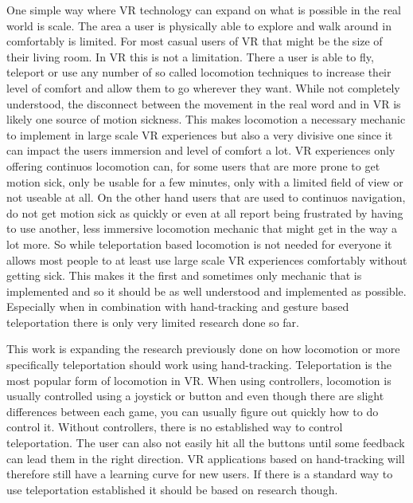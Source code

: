 One simple way where VR technology can expand on what is possible in the real world is scale. The area a user is physically able to explore and walk around in comfortably is limited. For most casual users of VR that might be the size of their living room. In VR this is not a limitation. There a user is able to fly, teleport or use any number of so called locomotion techniques to increase their level of comfort and allow them to go wherever they want. While not completely understood, the disconnect between the movement in the real word and in VR is likely one source of motion sickness. This makes locomotion a necessary mechanic to implement in large scale VR experiences but also a very divisive one since it can impact the users immersion and level of comfort a lot. VR experiences only offering continuos locomotion can, for some users that are more prone to get motion sick, only be usable for a few minutes, only with a limited field of view or not useable at all. On the other hand users that are used to continuos navigation, do not get motion sick as quickly or even at all report being frustrated by having to use another, less immersive locomotion mechanic that might get in the way a lot more. So while teleportation based locomotion is not needed for everyone it allows most people to at least use large scale VR experiences comfortably without getting sick. This makes it the first and sometimes only mechanic that is implemented and so it should be as well understood and implemented as possible. Especially when in combination with hand-tracking and gesture based teleportation there is only very limited research done so far.

This work is expanding the research previously done on how locomotion or more specifically teleportation should work using hand-tracking. Teleportation is the most popular form of locomotion in VR. When using controllers, locomotion is usually controlled using a joystick or button and even though there are slight differences between each game, you can usually figure out quickly how to do control it. Without controllers, there is no established way to control teleportation. The user can also not easily hit all the buttons until some feedback can lead them in the right direction. VR applications based on hand-tracking will therefore still have a learning curve for new users. If there is a standard way to use teleportation established it should be based on research though. 







